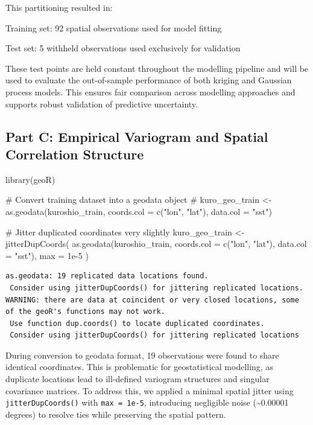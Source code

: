\documentclass[
  11pt,
]{article}
\newenvironment{Shaded}{\begin{snugshade}}{\end{snugshade}}
\newcommand{\AttributeTok}[1]{\textcolor[rgb]{0.40,0.45,0.13}{#1}}
\newcommand{\CommentTok}[1]{\textcolor[rgb]{0.37,0.37,0.37}{#1}}
\newcommand{\FloatTok}[1]{\textcolor[rgb]{0.68,0.00,0.00}{#1}}
\newcommand{\FunctionTok}[1]{\textcolor[rgb]{0.28,0.35,0.67}{#1}}
\newcommand{\NormalTok}[1]{\textcolor[rgb]{0.00,0.23,0.31}{#1}}
\newcommand{\OtherTok}[1]{\textcolor[rgb]{0.00,0.23,0.31}{#1}}
\newcommand{\StringTok}[1]{\textcolor[rgb]{0.13,0.47,0.30}{#1}}
\begin{document}
This partitioning resulted in:

Training set: 92 spatial observations used for model fitting

Test set: 5 withheld observations used exclusively for validation

These test points are held constant throughout the modelling pipeline
and will be used to evaluate the out-of-sample performance of both
kriging and Gaussian process models. This ensures fair comparison across
modelling approaches and supports robust validation of predictive
uncertainty.

\subsection{Part C: Empirical Variogram and Spatial Correlation
Structure}\label{part-c-empirical-variogram-and-spatial-correlation-structure}

\begin{Shaded}
\begin{Highlighting}[]
\FunctionTok{library}\NormalTok{(geoR)}

\CommentTok{\# Convert training dataset into a geodata object}
\CommentTok{\# kuro\_geo\_train \textless{}{-} as.geodata(kuroshio\_train, coords.col = c("lon", "lat"), data.col = "sst")}

\CommentTok{\# Jitter duplicated coordinates very slightly}
\NormalTok{kuro\_geo\_train }\OtherTok{\textless{}{-}} \FunctionTok{jitterDupCoords}\NormalTok{(}
  \FunctionTok{as.geodata}\NormalTok{(kuroshio\_train, }\AttributeTok{coords.col =} \FunctionTok{c}\NormalTok{(}\StringTok{"lon"}\NormalTok{, }\StringTok{"lat"}\NormalTok{), }\AttributeTok{data.col =} \StringTok{"sst"}\NormalTok{),}
  \AttributeTok{max =} \FloatTok{1e{-}5}
\NormalTok{)}
\end{Highlighting}
\end{Shaded}

\begin{verbatim}
as.geodata: 19 replicated data locations found. 
 Consider using jitterDupCoords() for jittering replicated locations. 
WARNING: there are data at coincident or very closed locations, some of the geoR's functions may not work.
 Use function dup.coords() to locate duplicated coordinates.
 Consider using jitterDupCoords() for jittering replicated locations 
\end{verbatim}

During conversion to geodata format, 19 observations were found to share
identical coordinates. This is problematic for geostatistical modelling,
as duplicate locations lead to ill-defined variogram structures and
singular covariance matrices. To address this, we applied a minimal
spatial jitter using \texttt{jitterDupCoords()} with
\texttt{max\ =\ 1e-5}, introducing negligible noise
(\textasciitilde0.00001 degrees) to resolve ties while preserving the
spatial pattern.
\end{document}

